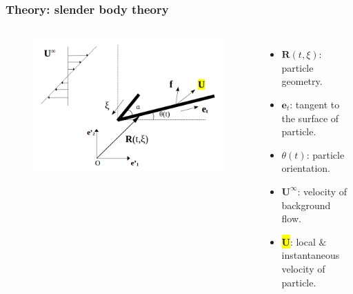 \documentclass{beamer}
\newcommand{\bi}{\begin{itemize}}
\newcommand{\ei}{\end{itemize}}
\begin{document}
\begin{frame}
	\frametitle{Theory: slender body theory}
	\begin{overlayarea}{\textwidth}{\textheight}
		\vspace{-0.8cm}
		\begin{columns}
			\begin{figure}[htb]
				\begin{center}
					\includegraphics[width=1\textwidth]{plots/rigid_particle6.png}
				\end{center}
			\end{figure}
			\small \bi 
			\item $\mathbf{R}(t,\xi)$: particle geometry.
			\item $\mathbf{e}_t$: tangent to the surface of particle.
			\item $\theta(t)$: particle orientation.
			\item $\mathbf{U}^\infty$: velocity of background flow.
			\item \colorbox{yellow}{$\mathbf{U}$}: local $\&$ instantaneous velocity of particle.
			\ei
		\end{columns}\vspace{0.5cm}
	\end{overlayarea}
\end{frame}

\end{document}

